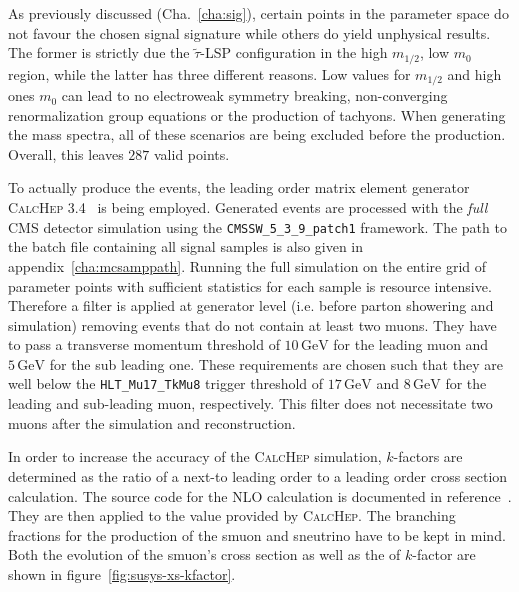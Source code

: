 As previously discussed (Cha.~\ref{cha:sig}), certain points in the parameter space do not favour the chosen signal signature while others do yield unphysical results. The former is strictly due the $\tilde{\tau}$-LSP configuration in the high $m_{1/2}$, low $m_0$ region, while the latter has three different reasons. Low values for $m_{1/2}$ and high ones $m_0$ can lead to no electroweak symmetry breaking, non-converging renormalization group equations or the production of tachyons. When generating the mass spectra, all of these scenarios are being excluded before the production. Overall, this leaves $287$ valid points.

To actually produce the events, the leading order matrix element generator \textsc{CalcHep 3.4}~\cite{calchep} is being employed. Generated events are processed with the \textit{full} CMS detector simulation using the \verb+CMSSW_5_3_9_patch1+ framework. The path to the batch file containing all signal samples is also given in appendix~\ref{cha:mcsamppath}. Running the full simulation on the entire grid of parameter points with sufficient statistics for each sample is resource intensive. Therefore a filter is applied at generator level (i.e. before parton showering and simulation) removing events that do not contain at least two muons. They have to pass a transverse momentum threshold of $10\,\text{GeV}$ for the leading muon and $5\,\text{GeV}$ for the sub leading one. These requirements are chosen such that they are well below the \verb+HLT_Mu17_TkMu8+ trigger threshold of $17\,\text{GeV}$ and $8\,\text{GeV}$ for the leading and sub-leading muon, respectively. This filter does not necessitate two muons after the simulation and reconstruction.

In order to increase the accuracy of the \textsc{CalcHep} simulation, $k$-factors are determined as the ratio of a next-to leading order to a leading order cross section calculation. The source code for the NLO calculation is documented in reference~\cite{susyxstool}. They are then applied to the value provided by \textsc{CalcHep}. The branching fractions for the production of the smuon and sneutrino have to be kept in mind. Both the evolution of the smuon's cross section as well as the of $k$-factor are shown in figure~\ref{fig:susys-xs-kfactor}.

